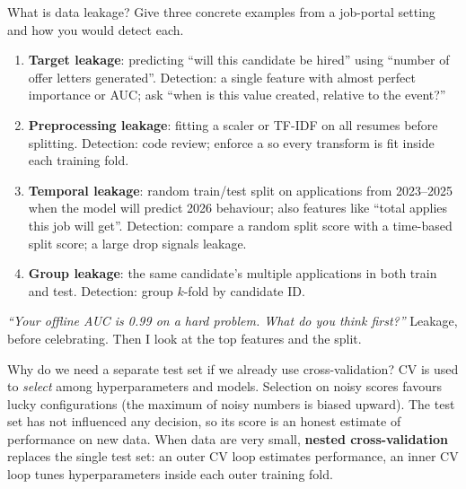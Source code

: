 \begin{qa}{What is data leakage? Give three concrete examples from a job-portal setting and how you would
detect each.}
\why
\begin{enumerate}
\item \textbf{Target leakage}: predicting ``will this candidate be hired'' using ``number of offer letters
  generated''. Detection: a single feature with almost perfect importance or AUC; ask ``when is this value
  created, relative to the event?''
\item \textbf{Preprocessing leakage}: fitting a scaler or TF-IDF on all resumes before splitting.
  Detection: code review; enforce a  so every transform is fit inside each training fold.
\item \textbf{Temporal leakage}: random train/test split on applications from 2023--2025 when the model
  will predict 2026 behaviour; also features like ``total applies this job will get''. Detection: compare a
  random split score with a time-based split score; a large drop signals leakage.
\item \textbf{Group leakage}: the same candidate's multiple applications in both train and test.
  Detection: group $k$-fold by candidate ID.
\end{enumerate}
\pushes \emph{``Your offline AUC is 0.99 on a hard problem. What do you think first?''} Leakage, before
celebrating. Then I look at the top features and the split.
\end{qa}

\begin{qa}{Why do we need a separate test set if we already use cross-validation?}
\why CV is used to \emph{select} among hyperparameters and models. Selection on noisy scores favours lucky
configurations (the maximum of noisy numbers is biased upward). The test set has not influenced any decision,
so its score is an honest estimate of performance on new data. When data are very small, \textbf{nested
cross-validation} replaces the single test set: an outer CV loop estimates performance, an inner CV loop tunes
hyperparameters inside each outer training fold.
\end{qa}

